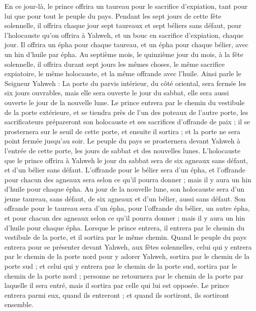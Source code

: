 \begin{multicols}{2}
En ce jour-là, le prince offrira un taureau pour le sacrifice d’expiation, tant pour lui que pour tout le peuple du pays.
Pendant les sept jours de cette fête solennelle, il offrira chaque jour sept taureaux et sept béliers sans défaut, pour l'holocauste qu'on offrira à Yahweh, et un bouc en sacrifice d’expiation, chaque jour.
Il offrira un épha pour chaque taureau, et un épha pour chaque bélier, avec un hin d'huile par épha.
Au septième mois, le quinzième jour du mois, à la fête solennelle, il offrira durant sept jours les mêmes choses, le même sacrifice expiatoire, le même holocauste, et la même offrande avec l'huile.
\VerseOne{}Ainsi parle le Seigneur Yahweh : La porte du parvis intérieur, du côté oriental, sera fermée les six jours ouvrables, mais elle sera ouverte le jour du sabbat, elle sera aussi ouverte le jour de la nouvelle lune.
Le prince entrera par le chemin du vestibule de la porte extérieure, et se tiendra près de l'un des poteaux de l'autre porte, les sacrificateurs prépareront son holocauste et ses sacrifices d’offrande de paix ; il se prosternera sur le seuil de cette porte, et ensuite il sortira ; et la porte ne sera point fermée jusqu’au soir.
Le peuple du pays se prosternera devant Yahweh à l'entrée de cette porte, les jours de sabbat et des nouvelles lunes.
L'holocauste que le prince offrira à Yahweh le jour du sabbat sera de six agneaux sans défaut, et d'un bélier sans défaut.
L’offrande pour le bélier sera d'un épha, et l’offrande pour chacun des agneaux sera selon ce qu'il pourra donner ; mais il y aura un hin d'huile pour chaque épha.
Au jour de la nouvelle lune, son holocauste sera d'un jeune taureau, sans défaut, de six agneaux et d'un bélier, aussi sans défaut.
Son offrande pour le taureau sera d’un épha, pour l’offrande du bélier, un autre épha, et pour chacun des agneaux selon ce qu'il pourra donner ; mais il y aura un hin d'huile pour chaque épha.
Lorsque le prince entrera, il entrera par le chemin du vestibule de la porte, et il sortira par le même chemin.
Quand le peuple du pays entrera pour se présenter devant Yahweh, aux fêtes solennelles, celui qui y entrera par le chemin de la porte nord pour y adorer Yahweh, sortira par le chemin de la porte sud ; et celui qui y entrera par le chemin de la porte sud, sortira par le chemin de la porte nord ; personne ne retournera par le chemin de la porte par laquelle il sera entré, mais il sortira par celle qui lui est opposée.
Le prince entrera parmi eux, quand ils entreront ; et quand ils sortiront, ils sortiront ensemble.

\end{multicols}
